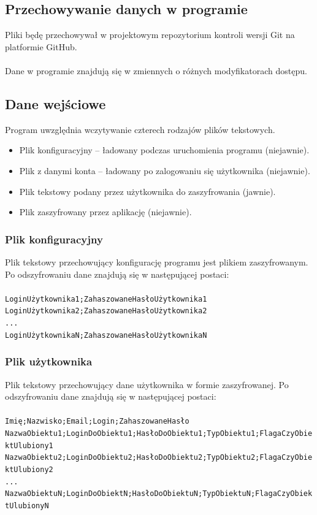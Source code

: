 \documentclass[a4paper]{article}
\newcommand{\prog}{\texttt}
\begin{document}
\subsection{Przechowywanie danych w programie}
Pliki będę przechowywał w projektowym repozytorium kontroli wersji Git na platformie GitHub.\\ \\
Dane w programie znajdują się w zmiennych o różnych modyfikatorach dostępu.

\subsection{Dane wejściowe}
Program uwzględnia wczytywanie czterech rodzajów plików tekstowych.
\begin{itemize}
    \item Plik konfiguracyjny -- ładowany podczas uruchomienia programu (niejawnie).
    \item Plik z danymi konta -- ładowany po zalogowaniu się użytkownika (niejawnie).
    \item Plik tekstowy podany przez użytkownika do zaszyfrowania (jawnie).
    \item Plik zaszyfrowany przez aplikację (niejawnie).
\end{itemize}

\subsubsection{Plik konfiguracyjny}\label{pKonf}
Plik tekstowy przechowujący konfigurację programu jest plikiem zaszyfrowanym. Po odszyfrowaniu dane znajdują się w następującej postaci:\\ \\
\prog{LoginUżytkownika1;ZahaszowaneHasłoUżytkownika1\\LoginUżytkownika2;ZahaszowaneHasłoUżytkownika2\\...\\LoginUżytkownikaN;ZahaszowaneHasłoUżytkownikaN}

\subsubsection{Plik użytkownika}\label{pUzy}
Plik tekstowy przechowujący dane użytkownika w formie zaszyfrowanej. Po odszyfrowaniu dane znajdują się w następującej postaci:\\ \\
\prog{Imię;Nazwisko;Email;Login;ZahaszowaneHasło\\NazwaObiektu1;LoginDoObiektu1;HasłoDoObiektu1;TypObiektu1;FlagaCzyObiektUlubiony1\\NazwaObiektu2;LoginDoObiektu2;HasłoDoObiektu2;TypObiektu2;FlagaCzyObiektUlubiony2\\...\\NazwaObiektuN;LoginDoObiektN;HasłoDoObiektuN;TypObiektuN;FlagaCzyObiektUlubionyN}
\end{document}
